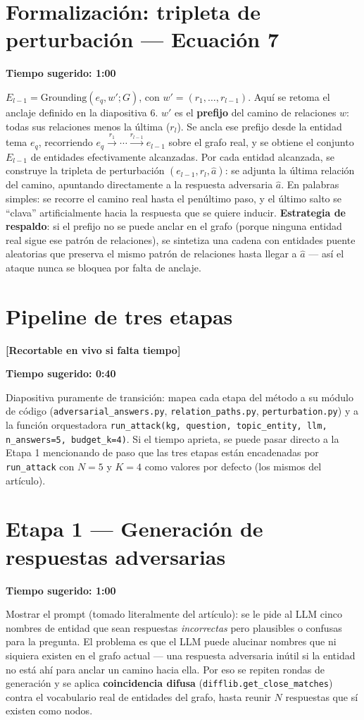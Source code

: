 \documentclass[11pt]{article}
\newcommand{\tiempo}[1]{{\small\color{timecolor}\textbf{Tiempo sugerido: #1}}\par\vspace{0.3em}}
\newcommand{\recortable}{{\small\color{cutcolor}\textbf{[Recortable en vivo si falta tiempo]}}\par\vspace{0.3em}}
\begin{document}
\section{Formalización: tripleta de perturbación --- Ecuación 7}
\tiempo{1:00}
$\displaystyle E_{l-1} = \text{Grounding}(e_q, w'; G)$, con $w' = (r_1, \dots, r_{l-1})$.
Aquí se retoma el anclaje definido en la diapositiva 6. $w'$ es el \textbf{prefijo} del
camino de relaciones $w$: todas sus relaciones menos la última ($r_l$). Se ancla ese
prefijo desde la entidad tema $e_q$, recorriendo
$e_q \xrightarrow{r_1} \cdots \xrightarrow{r_{l-1}} e_{l-1}$ sobre el grafo real, y se
obtiene el conjunto $E_{l-1}$ de entidades efectivamente alcanzadas. Por cada entidad
alcanzada, se construye la tripleta de perturbación
$(e_{l-1}, r_l, \hat{a})$: se adjunta la última relación del camino, apuntando directamente
a la respuesta adversaria $\hat{a}$. En palabras simples: se recorre el camino real hasta el
penúltimo paso, y el último salto se ``clava'' artificialmente hacia la respuesta que se
quiere inducir. \textbf{Estrategia de respaldo}: si el prefijo no se puede anclar en el
grafo (porque ninguna entidad real sigue ese patrón de relaciones), se sintetiza una cadena
con entidades puente aleatorias que preserva el mismo patrón de relaciones hasta llegar a
$\hat{a}$ --- así el ataque nunca se bloquea por falta de anclaje.

\section{Pipeline de tres etapas}
\recortable
\tiempo{0:40}
Diapositiva puramente de transición: mapea cada etapa del método a su módulo de código
(\texttt{adversarial\_answers.py}, \texttt{relation\_paths.py}, \texttt{perturbation.py}) y
a la función orquestadora \texttt{run\_attack(kg, question, topic\_entity, llm,
n\_answers=5, budget\_k=4)}. Si el tiempo aprieta, se puede pasar directo a la Etapa 1
mencionando de paso que las tres etapas están encadenadas por \texttt{run\_attack} con
$N=5$ y $K=4$ como valores por defecto (los mismos del artículo).

\section{Etapa 1 --- Generación de respuestas adversarias}
\tiempo{1:00}
Mostrar el prompt (tomado literalmente del artículo): se le pide al LLM cinco nombres de
entidad que sean respuestas \emph{incorrectas} pero plausibles o confusas para la pregunta.
El problema es que el LLM puede alucinar nombres que ni siquiera existen en el grafo actual
--- una respuesta adversaria inútil si la entidad no está ahí para anclar un camino hacia
ella. Por eso se repiten rondas de generación y se aplica \textbf{coincidencia difusa}
(\texttt{difflib.get\_close\_matches}) contra el vocabulario real de entidades del grafo,
hasta reunir $N$ respuestas que sí existen como nodos.
\end{document}
